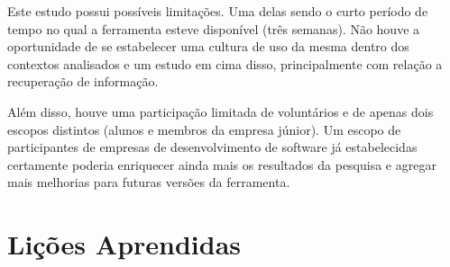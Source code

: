 Este estudo possui possíveis limitações. Uma delas sendo o curto período de tempo no qual a ferramenta esteve disponível (três semanas). Não houve a oportunidade de se estabelecer uma cultura de uso da mesma dentro dos contextos analisados e um estudo em cima disso, principalmente com relação a recuperação de informação.

Além disso, houve uma participação limitada de voluntários e de apenas dois escopos distintos (alunos e membros da empresa júnior). Um escopo de participantes de empresas de desenvolvimento de software já estabelecidas certamente poderia enriquecer ainda mais os resultados da pesquisa e agregar mais melhorias para futuras versões da ferramenta.

\section{Lições Aprendidas}
